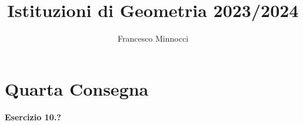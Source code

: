 \documentclass[a4paper]{article}
\title{Istituzioni di Geometria 2023/2024}
\author{Francesco Minnocci}
\theoremstyle{definition}
\theoremstyle{definition}
\theoremstyle{remark}
\theoremstyle{definition}
\begin{document}
\maketitle
\section*{Quarta Consegna}
\textbf{Esercizio 10.?}
\end{document}
